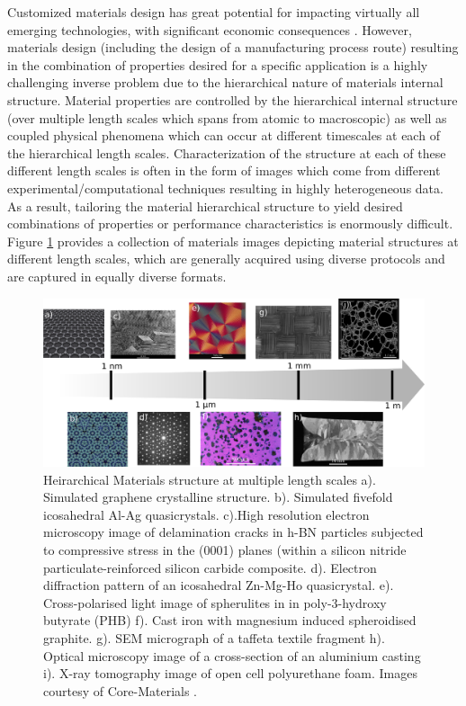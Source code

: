 \documentclass{bmcart}
\begin{document}
Customized materials design has great potential for impacting virtually all emerging technologies, with significant economic consequences \cite{ward2012materials, allison2006integrated, MGIwhite, MGI2014, allison2011integrated, olson2000designing, national2008integrated, schmitz2012integrative, robinson2013tms, allisonintegrated, TMSfieldstudy}. However, materials design (including the design of a manufacturing process route) resulting in the combination of properties desired for a specific application is a highly challenging inverse problem due to the hierarchical nature of materials internal structure. Material properties are controlled by the hierarchical internal structure (over multiple length scales which spans from atomic to macroscopic) as well as coupled physical phenomena which can occur at different timescales at each of the hierarchical length scales. Characterization of the structure at each of these different length scales is often in the form of images which come from different experimental/computational techniques resulting in highly heterogeneous data. As a result, tailoring the material hierarchical structure to yield desired combinations of properties or performance characteristics is enormously difficult. Figure \ref{fig:length_scales} provides a collection of materials images depicting material structures at different length scales, which are generally acquired using diverse protocols and are captured in equally diverse formats.

\begin{figure}
    \includegraphics[scale=.23]{fig/lengthScales1.png}
    \caption{Heirarchical Materials structure at multiple length scales
      a). Simulated graphene crystalline structure. b). Simulated fivefold icosahedral Al-Ag quasicrystals. c).High resolution electron microscopy image of delamination cracks in h-BN particles subjected to compressive stress in the (0001) planes (within a silicon nitride particulate-reinforced silicon carbide composite. d). Electron diffraction pattern of an icosahedral Zn-Mg-Ho quasicrystal. e). Cross-polarised light image of spherulites in in poly-3-hydroxy butyrate (PHB) f). Cast iron with magnesium induced spheroidised graphite. g). SEM micrograph of a taffeta textile fragment h). Optical microscopy image of a cross-section of an aluminium casting  i). X-ray tomography image of open cell polyurethane foam. Images courtesy of Core-Materials \cite{coreMaterials}.}
  \label{fig:length_scales}
\end{figure}
\end{document}
